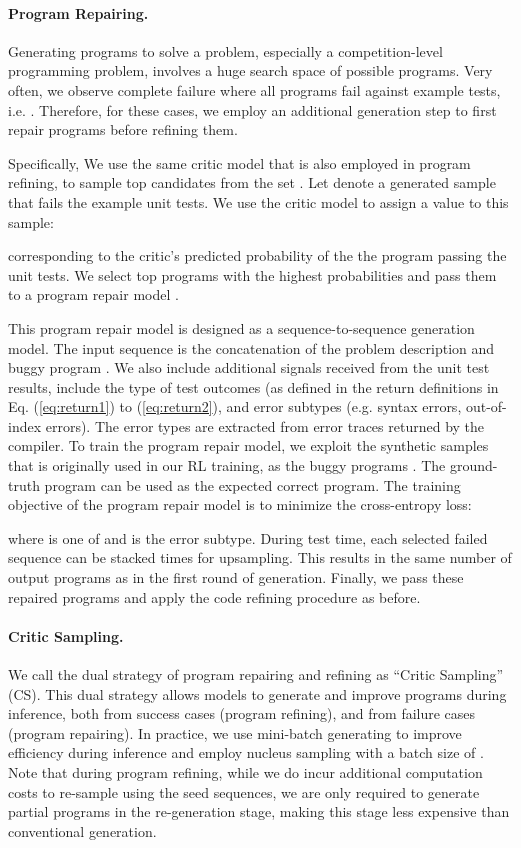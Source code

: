 \documentclass{article}
\begin{document}
\paragraph{Program Repairing.}
Generating programs to solve a problem, especially a competition-level programming problem, involves a huge search space of possible programs.
Very often, we observe complete failure where all programs fail against example tests, i.e. .
Therefore, for these cases, we employ an additional generation step to first repair programs before refining them. 

Specifically, We use the same critic model that is also employed in program refining, to sample top candidates from the set .
Let  denote a generated sample that fails the example unit tests. We use the critic model to assign a value to this sample: 

corresponding to the critic's predicted probability of the the program passing the unit tests. 
We select top  programs with the highest probabilities and pass them to a program repair model .

This program repair model is designed as a sequence-to-sequence generation model.
The input sequence is the concatenation of the problem description  and buggy program . 
We also include additional signals received from the unit test results, include the type of test outcomes (as defined in the return definitions in Eq. (\ref{eq:return1}) to (\ref{eq:return2}), and error subtypes (e.g. syntax errors, out-of-index errors).
The error types are extracted from error traces returned by the compiler.
To train the program repair model, we exploit the synthetic samples that is originally used in our RL training,
as the buggy programs .
The ground-truth program  can be used as the expected correct program. 
The training objective of the program repair model is to minimize the cross-entropy loss: 

where  is one of  and  is the error subtype.
During test time, each selected failed sequence can be stacked  times for upsampling.
This results in the same number of output programs  as in the first round of generation.
Finally, we pass these  repaired programs and apply the code refining procedure as before. 

\paragraph{Critic Sampling.}
We call the dual strategy of program repairing and refining as ``Critic Sampling'' (CS). 
This dual strategy allows models to generate and improve programs during inference, both from success cases (program refining), and from failure cases (program repairing). 
In practice, we use mini-batch generating to improve efficiency during inference and employ nucleus sampling with a batch size of . 
Note that during program refining, while we do incur additional computation costs to re-sample using the seed sequences, we are only required to generate partial programs in the re-generation stage, making this stage less expensive than conventional generation.
\end{document}
